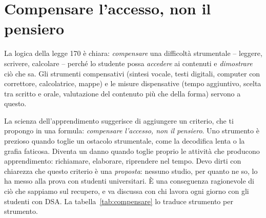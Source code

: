 \section{Compensare l'accesso, non il pensiero}

La logica della legge 170 è chiara: \emph{compensare} una difficoltà
strumentale -- leggere, scrivere, calcolare -- perché lo studente possa
\emph{accedere} ai contenuti e \emph{dimostrare} ciò che sa. Gli
strumenti compensativi (sintesi vocale, testi digitali, computer con
correttore, calcolatrice, mappe) e le misure dispensative (tempo
aggiuntivo, scelta tra scritto e orale, valutazione del contenuto più
che della forma) servono a questo.

La scienza dell'apprendimento suggerisce di aggiungere un criterio,
che ti propongo in una formula: \emph{compensare l'accesso, non il
pensiero}. Uno strumento è prezioso quando toglie un ostacolo
strumentale, come la decodifica lenta o la grafia faticosa. Diventa un
danno quando toglie proprio le attività che producono apprendimento:
richiamare, elaborare, riprendere nel tempo. Devo dirti con chiarezza
che questo criterio è una \emph{proposta}: nessuno studio, per quanto
ne so, lo ha messo alla prova con studenti universitari. È una
conseguenza ragionevole di ciò che sappiamo sul recupero, e va
discussa con chi lavora ogni giorno con gli studenti con DSA. La
tabella~\ref{tab:compensare} lo traduce strumento per strumento.

